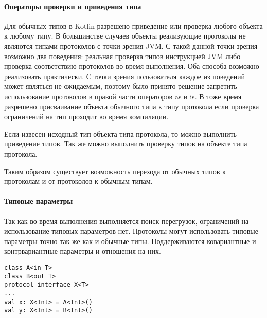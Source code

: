 \paragraph{Операторы проверки и приведения типа}
Для обычных типов в Kotlin разрешено приведение или проверка любого объекта к любому типу. В большинстве случаев объекты реализующие протоколы не являются типами протоколов с точки зрения JVM. С такой данной точки зрения возможно два поведения: реальная проверка типов инструкцией JVM либо проверка соответствию протоколов во время выполнения. Оба способа возможно реализовать практически. С точки зрения пользователя каждое из поведений может являться не ожидаемым, поэтому было принято решение запретить использование протоколов в правой части операторов as и is. В тоже время разрешено присваивание объекта обычного типа к типу протокола если проверка ограничений на тип проходит во время компиляции.

Если извесен исходный тип объекта типа протокола, то можно выполнить приведение типов. Так же можно выполнить проверку типов на объекте типа протокола.

Таким образом существует возможность перехода от обычных типов к протоколам и от протоколов к обычным типам.

\paragraph{Типовые параметры}
Так как во время выполнения выполняется поиск перегрузок, ограничений на использование типовых параметров нет. Протоколы могут использовать типовые параметры точно так же как и обычные типы. Поддерживаются ковариантные и контрвариантные параметры и отношения на них.

\begin{verbatim}
class A<in T>
class B<out T>
protocol interface X<T>
...
val x: X<Int> = A<Int>()
val y: X<Int> = B<Int>()
\end{verbatim}

%



